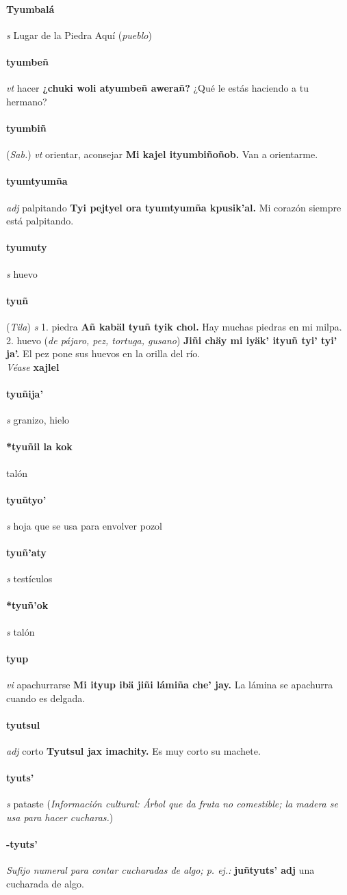 \documentclass{scrbook}
\newcommand{\entry}[1]{\paragraph{#1}}
\newcommand{\onedefinition}[1]{#1.}
\newcommand{\nontranslationdef}[1]{\textit{#1}}
\newcommand{\partofspeech}[1]{\textit{#1}}
\newcommand{\spanishtranslation}[1]{#1}
\newcommand{\clarification}[1]{(\textit{#1})}
\newcommand{\cholexample}[1]{\textbf{#1}}
\newcommand{\exampletranslation}[1]{#1}
\newcommand{\alsosee}[1]{\\\textit{Véase} \textbf{#1}}
\newcommand{\relevantdialect}[1]{(\textit{#1})}
\newcommand{\culturalinformation}[1]{(\textit{#1})}
\begin{document}
\begin{multicols}{2}
\entry{Tyumbalá}
\partofspeech{s}
\spanishtranslation{Lugar de la Piedra Aquí}
\clarification{pueblo}

\entry{tyumbeñ}
\partofspeech{vt}
\spanishtranslation{hacer}
\cholexample{¿chuki woli atyumbeñ awerañ?}
\exampletranslation{¿Qué le estás haciendo a tu hermano?}

\entry{tyumbiñ}
\relevantdialect{Sab.}
\partofspeech{vt}
\spanishtranslation{orientar, aconsejar}
\cholexample{Mi kajel ityumbiñoñob.}
\exampletranslation{Van a orientarme.}

\entry{tyumtyumña}
\partofspeech{adj}
\spanishtranslation{palpitando}
\cholexample{Tyi pejtyel ora tyumtyumña kpusik'al.}
\exampletranslation{Mi corazón siempre está palpitando.}

\entry{tyumuty}
\partofspeech{s}
\spanishtranslation{huevo}

\entry{tyuñ}
\relevantdialect{Tila}
\partofspeech{s}
\onedefinition{1}
\spanishtranslation{piedra}
\cholexample{Añ kabäl tyuñ tyik chol.}
\exampletranslation{Hay muchas piedras en mi milpa.}
\onedefinition{2}
\spanishtranslation{huevo}
\clarification{de pájaro, pez, tortuga, gusano}
\cholexample{Jiñi chäy mi iyäk' ityuñ tyi' tyi' ja'.}
\exampletranslation{El pez pone sus huevos en la orilla del río.}
\alsosee{xajlel}

\entry{tyuñija'}
\partofspeech{s}
\spanishtranslation{granizo, hielo}

\entry{*tyuñil la kok}
\spanishtranslation{talón}

\entry{tyuñtyo'}
\partofspeech{s}
\spanishtranslation{hoja que se usa para envolver pozol}

\entry{tyuñ'aty}
\partofspeech{s}
\spanishtranslation{testículos}

\entry{*tyuñ'ok}
\partofspeech{s}
\spanishtranslation{talón}

\entry{tyup}
\partofspeech{vi}
\spanishtranslation{apachurrarse}
\cholexample{Mi ityup ibä jiñi lámiña che' jay.}
\exampletranslation{La lámina se apachurra cuando es delgada.}

\entry{tyutsul}
\partofspeech{adj}
\spanishtranslation{corto}
\cholexample{Tyutsul jax imachity.}
\exampletranslation{Es muy corto su machete.}

\entry{tyuts'}
\partofspeech{s}
\spanishtranslation{pataste}
\culturalinformation{Información cultural: Árbol que da fruta no comestible; la madera se usa para hacer cucharas.}

\entry{-tyuts'}
\nontranslationdef{Sufijo numeral para contar cucharadas de algo; p. ej.:}
\cholexample{juñtyuts' adj}
\exampletranslation{una cucharada de algo.}


\end{multicols}
\end{document}
